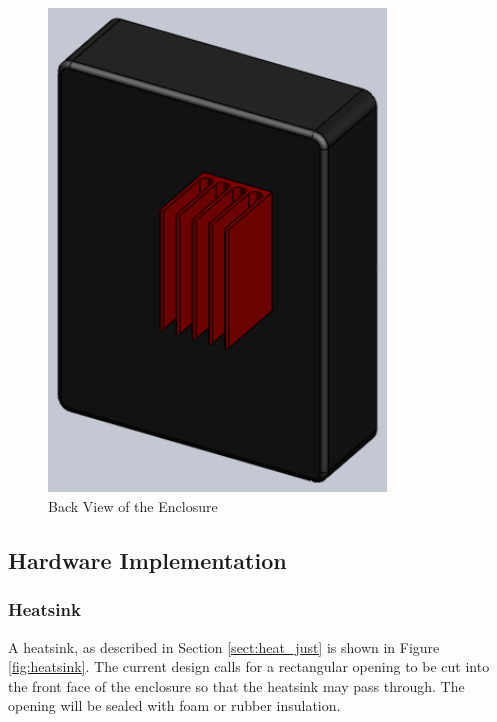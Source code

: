 \documentclass{article}
\numberwithin{figure}{section}
\numberwithin{equation}{section}
\begin{document}
{\begin{figure}[H]
	\centering
	\includegraphics[width=0.8\textwidth]{Assembly3}
	\caption{Back View of the Enclosure}
	\label{fig:enclosureback}
\end{figure}

\subsection{Hardware Implementation} \label{sect:hardwareimp}

\subsubsection{Heatsink} \label{sect:heatsinkimplementation}

A heatsink, as described in Section \ref{sect:heat_just} is shown in Figure \ref{fig:heatsink}.  The current design calls for a rectangular opening to be cut into the front face of the enclosure so that the heatsink may pass through. The opening will be sealed with foam or rubber insulation.

}
\end{document}
